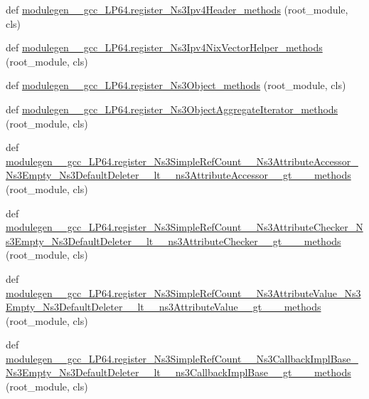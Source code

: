 \begin{DoxyCompactItemize}
\item 
def \hyperlink{namespacemodulegen____gcc__LP64_a7c04166bfa5c9e31af5742b29aae267d}{modulegen\+\_\+\+\_\+gcc\+\_\+\+L\+P64.\+register\+\_\+\+Ns3\+Ipv4\+Header\+\_\+methods} (root\+\_\+module, cls)
\item 
def \hyperlink{namespacemodulegen____gcc__LP64_a569591c4bf35ed8ed0ebe4e90115c036}{modulegen\+\_\+\+\_\+gcc\+\_\+\+L\+P64.\+register\+\_\+\+Ns3\+Ipv4\+Nix\+Vector\+Helper\+\_\+methods} (root\+\_\+module, cls)
\item 
def \hyperlink{namespacemodulegen____gcc__LP64_a37449428b6bb64d5e534ebe801291a86}{modulegen\+\_\+\+\_\+gcc\+\_\+\+L\+P64.\+register\+\_\+\+Ns3\+Object\+\_\+methods} (root\+\_\+module, cls)
\item 
def \hyperlink{namespacemodulegen____gcc__LP64_ab66e5c7d4bfc0a0524b69d37ef0bbb53}{modulegen\+\_\+\+\_\+gcc\+\_\+\+L\+P64.\+register\+\_\+\+Ns3\+Object\+Aggregate\+Iterator\+\_\+methods} (root\+\_\+module, cls)
\item 
def \hyperlink{namespacemodulegen____gcc__LP64_a9b358364d845a1ffcabb6be20a325b9d}{modulegen\+\_\+\+\_\+gcc\+\_\+\+L\+P64.\+register\+\_\+\+Ns3\+Simple\+Ref\+Count\+\_\+\+\_\+\+Ns3\+Attribute\+Accessor\+\_\+\+Ns3\+Empty\+\_\+\+Ns3\+Default\+Deleter\+\_\+\+\_\+lt\+\_\+\+\_\+ns3\+Attribute\+Accessor\+\_\+\+\_\+gt\+\_\+\+\_\+\+\_\+methods} (root\+\_\+module, cls)
\item 
def \hyperlink{namespacemodulegen____gcc__LP64_acc11c420e32471422fd00230d89398af}{modulegen\+\_\+\+\_\+gcc\+\_\+\+L\+P64.\+register\+\_\+\+Ns3\+Simple\+Ref\+Count\+\_\+\+\_\+\+Ns3\+Attribute\+Checker\+\_\+\+Ns3\+Empty\+\_\+\+Ns3\+Default\+Deleter\+\_\+\+\_\+lt\+\_\+\+\_\+ns3\+Attribute\+Checker\+\_\+\+\_\+gt\+\_\+\+\_\+\+\_\+methods} (root\+\_\+module, cls)
\item 
def \hyperlink{namespacemodulegen____gcc__LP64_abcd5829b1993ba7d28274b9959f71417}{modulegen\+\_\+\+\_\+gcc\+\_\+\+L\+P64.\+register\+\_\+\+Ns3\+Simple\+Ref\+Count\+\_\+\+\_\+\+Ns3\+Attribute\+Value\+\_\+\+Ns3\+Empty\+\_\+\+Ns3\+Default\+Deleter\+\_\+\+\_\+lt\+\_\+\+\_\+ns3\+Attribute\+Value\+\_\+\+\_\+gt\+\_\+\+\_\+\+\_\+methods} (root\+\_\+module, cls)
\item 
def \hyperlink{namespacemodulegen____gcc__LP64_abad80b77479df17974cc787f14a2406f}{modulegen\+\_\+\+\_\+gcc\+\_\+\+L\+P64.\+register\+\_\+\+Ns3\+Simple\+Ref\+Count\+\_\+\+\_\+\+Ns3\+Callback\+Impl\+Base\+\_\+\+Ns3\+Empty\+\_\+\+Ns3\+Default\+Deleter\+\_\+\+\_\+lt\+\_\+\+\_\+ns3\+Callback\+Impl\+Base\+\_\+\+\_\+gt\+\_\+\+\_\+\+\_\+methods} (root\+\_\+module, cls)

\end{DoxyCompactItemize}
